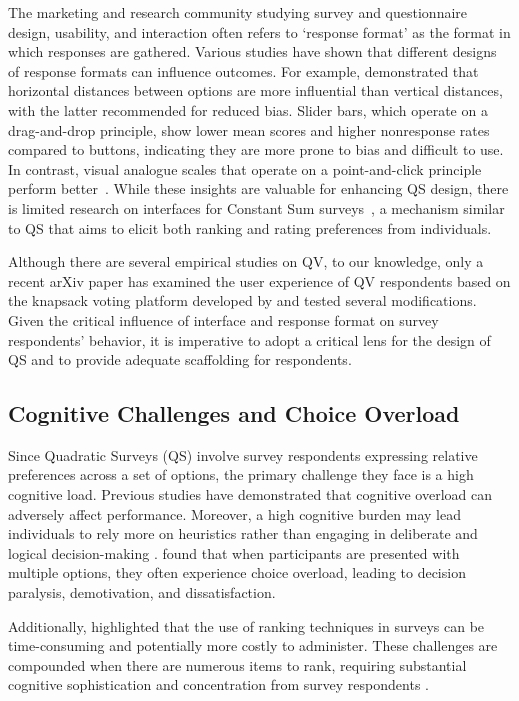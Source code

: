 The marketing and research community studying survey and questionnaire design, usability, and interaction often refers to `response format' as the format in which responses are gathered. Various studies have shown that different designs of response formats can influence outcomes. For example, \textcite{weijtersExtremityHorizontalVertical2021} demonstrated that horizontal distances between options are more influential than vertical distances, with the latter recommended for reduced bias. Slider bars, which operate on a drag-and-drop principle, show lower mean scores and higher nonresponse rates compared to buttons, indicating they are more prone to bias and difficult to use. In contrast, visual analogue scales that operate on a point-and-click principle perform better~\cite{toepoelSlidersVisualAnalogue2018}. While these insights are valuable for enhancing QS design, there is limited research on interfaces for Constant Sum surveys~\cite{hauserIntensityMeasuresConsumer1980a}, a mechanism similar to QS that aims to elicit both ranking and rating preferences from individuals.

Although there are several empirical studies on QV, to our knowledge, only a recent arXiv paper has examined the user experience of QV respondents based on the knapsack voting platform developed by \textcite{goelKnapsackVotingVoting} and tested several modifications. Given the critical influence of interface and response format on survey respondents' behavior, it is imperative to adopt a critical lens for the design of QS and to provide adequate scaffolding for respondents.

\subsection{Cognitive Challenges and Choice Overload}
Since Quadratic Surveys (QS) involve survey respondents expressing relative preferences across a set of options, the primary challenge they face is a high cognitive load. Previous studies have demonstrated that cognitive overload can adversely affect performance. Moreover, a high cognitive burden may lead individuals to rely more on heuristics rather than engaging in deliberate and logical decision-making \cite{daniel2017thinking}. \textcite{iyengarWhenChoiceDemotivating2000} found that when participants are presented with multiple options, they often experience choice overload, leading to decision paralysis, demotivation, and dissatisfaction.

Additionally, \textcite{alwinMeasurementValuesSurveys1985} highlighted that the use of ranking techniques in surveys can be time-consuming and potentially more costly to administer. These challenges are compounded when there are numerous items to rank, requiring substantial cognitive sophistication and concentration from survey respondents \cite{featherMeasurementValuesEffects1973}.

